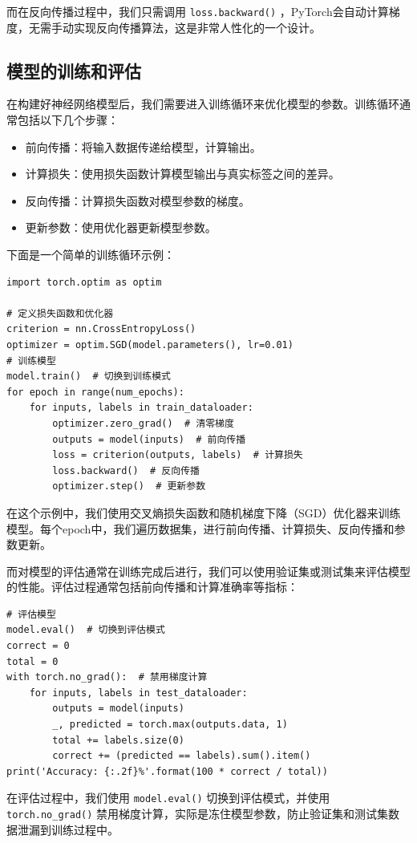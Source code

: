 而在反向传播过程中，我们只需调用 \verb|loss.backward()| ，PyTorch会自动计算梯度，无需手动实现反向传播算法，这是非常人性化的一个设计。

\subsection{模型的训练和评估}

在构建好神经网络模型后，我们需要进入训练循环来优化模型的参数。训练循环通常包括以下几个步骤：
\begin{itemize}
    \item 前向传播：将输入数据传递给模型，计算输出。
    \item 计算损失：使用损失函数计算模型输出与真实标签之间的差异。
    \item 反向传播：计算损失函数对模型参数的梯度。
    \item 更新参数：使用优化器更新模型参数。
\end{itemize}

下面是一个简单的训练循环示例：
\begin{verbatim}
import torch.optim as optim

# 定义损失函数和优化器
criterion = nn.CrossEntropyLoss()
optimizer = optim.SGD(model.parameters(), lr=0.01)
# 训练模型
model.train()  # 切换到训练模式
for epoch in range(num_epochs):
    for inputs, labels in train_dataloader:
        optimizer.zero_grad()  # 清零梯度
        outputs = model(inputs)  # 前向传播
        loss = criterion(outputs, labels)  # 计算损失
        loss.backward()  # 反向传播
        optimizer.step()  # 更新参数
\end{verbatim}
在这个示例中，我们使用交叉熵损失函数和随机梯度下降（SGD）优化器来训练模型。每个epoch中，我们遍历数据集，进行前向传播、计算损失、反向传播和参数更新。

而对模型的评估通常在训练完成后进行，我们可以使用验证集或测试集来评估模型的性能。评估过程通常包括前向传播和计算准确率等指标：
\begin{verbatim}
# 评估模型
model.eval()  # 切换到评估模式
correct = 0
total = 0
with torch.no_grad():  # 禁用梯度计算
    for inputs, labels in test_dataloader:
        outputs = model(inputs)
        _, predicted = torch.max(outputs.data, 1)
        total += labels.size(0)
        correct += (predicted == labels).sum().item()
print('Accuracy: {:.2f}%'.format(100 * correct / total))
\end{verbatim}
在评估过程中，我们使用 \verb|model.eval()| 切换到评估模式，并使用 \verb|torch.no_grad()| 禁用梯度计算，实际是冻住模型参数，防止验证集和测试集数据泄漏到训练过程中。

